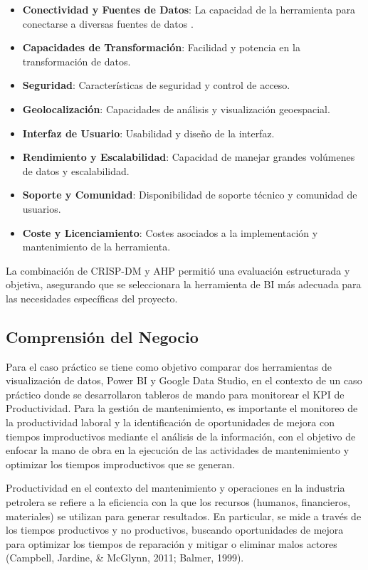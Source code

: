 \documentclass[
  11pt,
  bookmarksnumbered]{article}
\begin{document}
\begin{itemize}
\item
  \textbf{Conectividad y Fuentes de Datos}: La capacidad de la herramienta para conectarse a diversas fuentes de datos \textcite{saaty1980analytic}.
\item
  \textbf{Capacidades de Transformación}: Facilidad y potencia en la transformación de datos.
\item
  \textbf{Seguridad}: Características de seguridad y control de acceso.
\item
  \textbf{Geolocalización}: Capacidades de análisis y visualización geoespacial.
\item
  \textbf{Interfaz de Usuario}: Usabilidad y diseño de la interfaz.
\item
  \textbf{Rendimiento y Escalabilidad}: Capacidad de manejar grandes volúmenes de datos y escalabilidad.
\item
  \textbf{Soporte y Comunidad}: Disponibilidad de soporte técnico y comunidad de usuarios.
\item
  \textbf{Coste y Licenciamiento}: Costes asociados a la implementación y mantenimiento de la herramienta.
\end{itemize}

La combinación de CRISP-DM y AHP permitió una evaluación estructurada y objetiva, asegurando que se seleccionara la herramienta de BI más adecuada para las necesidades específicas del proyecto.

\hypertarget{comprensiuxf3n-del-negocio}{%
\subsection{Comprensión del Negocio}\label{comprensiuxf3n-del-negocio}}

Para el caso práctico se tiene como objetivo comparar dos herramientas de visualización de datos, Power BI y Google Data Studio, en el contexto de un caso práctico donde se desarrollaron tableros de mando para monitorear el KPI de Productividad.
Para la gestión de mantenimiento, es importante el monitoreo de la productividad laboral y la identificación de oportunidades de mejora con tiempos improductivos mediante el análisis de la información, con el objetivo de enfocar la mano de obra en la ejecución de las actividades de mantenimiento y optimizar los tiempos improductivos que se generan.

Productividad en el contexto del mantenimiento y operaciones en la industria petrolera se refiere a la eficiencia con la que los recursos (humanos, financieros, materiales) se utilizan para generar resultados.
En particular, se mide a través de los tiempos productivos y no productivos, buscando oportunidades de mejora para optimizar los tiempos de reparación y mitigar o eliminar malos actores (Campbell, Jardine, \& McGlynn, 2011; Balmer, 1999).
\end{document}
